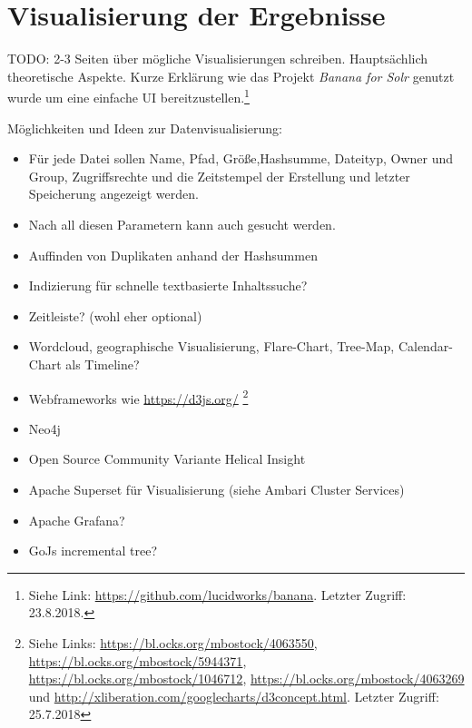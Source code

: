 \chapter{Visualisierung der Ergebnisse}
\label{ch:data_visualization}
TODO: 2-3 Seiten über mögliche Visualisierungen schreiben. Hauptsächlich theoretische Aspekte. Kurze Erklärung wie das Projekt \textit{Banana for Solr} genutzt wurde um eine
einfache UI bereitzustellen.\footnote{Siehe Link: \url{https://github.com/lucidworks/banana}. Letzter Zugriff: 23.8.2018.}

Möglichkeiten und Ideen zur Datenvisualisierung:
\begin{itemize}
\item Für jede Datei sollen Name, Pfad, Größe,Hashsumme, Dateityp, Owner und Group, Zugriffsrechte und die Zeitstempel der Erstellung und letzter Speicherung angezeigt werden. 
\item Nach all diesen Parametern kann auch gesucht werden.
\item Auffinden von Duplikaten anhand der Hashsummen
\item Indizierung für schnelle textbasierte Inhaltssuche?
\item Zeitleiste? (wohl eher optional)
\item Wordcloud, geographische Visualisierung, Flare-Chart, Tree-Map, Calendar-Chart als Timeline?
\item Webframeworks wie \url{https://d3js.org/} \footnote{Siehe Links: \url{https://bl.ocks.org/mbostock/4063550}, \url{https://bl.ocks.org/mbostock/5944371}, \url{https://bl.ocks.org/mbostock/1046712}, \url{https://bl.ocks.org/mbostock/4063269} und \url{http://xliberation.com/googlecharts/d3concept.html}. Letzter Zugriff: 25.7.2018}
\item Neo4j
\item Open Source Community Variante Helical Insight
\item Apache Superset für Visualisierung (siehe Ambari Cluster Services)
\item Apache Grafana?
\item GoJs incremental tree?
\end{itemize}
